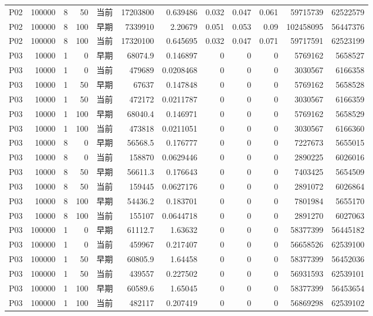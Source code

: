 \documentclass[UTF8,a4paper,10pt,twocolumn,fontset=fandol]{ctexart}
\begin{document}
\begin{longtable}{@{}lrrrlrrrrrrr@{}}
P02 & 100000 & 8 & 50 & 当前 & 17203800 & 0.639486 & 0.032 & 0.047 & 0.061 & 59715739 & 62522579 \\
P02 & 100000 & 8 & 100 & 早期 & 7339910 & 2.20679 & 0.051 & 0.053 & 0.09 & 102458095 & 56447376 \\
P02 & 100000 & 8 & 100 & 当前 & 17320100 & 0.645695 & 0.032 & 0.047 & 0.071 & 59717591 & 62523199 \\
P03 & 10000 & 1 & 0 & 早期 & 68074.9 & 0.146897 & 0 & 0 & 0 & 5769162 & 5658527 \\
P03 & 10000 & 1 & 0 & 当前 & 479689 & 0.0208468 & 0 & 0 & 0 & 3030567 & 6166358 \\
P03 & 10000 & 1 & 50 & 早期 & 67637 & 0.147848 & 0 & 0 & 0 & 5769162 & 5658528 \\
P03 & 10000 & 1 & 50 & 当前 & 472172 & 0.0211787 & 0 & 0 & 0 & 3030567 & 6166359 \\
P03 & 10000 & 1 & 100 & 早期 & 68040.4 & 0.146971 & 0 & 0 & 0 & 5769162 & 5658529 \\
P03 & 10000 & 1 & 100 & 当前 & 473818 & 0.0211051 & 0 & 0 & 0 & 3030567 & 6166360 \\
P03 & 10000 & 8 & 0 & 早期 & 56568.5 & 0.176777 & 0 & 0 & 0 & 7227673 & 5655015 \\
P03 & 10000 & 8 & 0 & 当前 & 158870 & 0.0629446 & 0 & 0 & 0 & 2890225 & 6026016 \\
P03 & 10000 & 8 & 50 & 早期 & 56611.3 & 0.176643 & 0 & 0 & 0 & 7403425 & 5654509 \\
P03 & 10000 & 8 & 50 & 当前 & 159445 & 0.0627176 & 0 & 0 & 0 & 2891072 & 6026864 \\
P03 & 10000 & 8 & 100 & 早期 & 54436.2 & 0.183701 & 0 & 0 & 0 & 7801984 & 5655170 \\
P03 & 10000 & 8 & 100 & 当前 & 155107 & 0.0644718 & 0 & 0 & 0 & 2891270 & 6027063 \\
P03 & 100000 & 1 & 0 & 早期 & 61112.7 & 1.63632 & 0 & 0 & 0 & 58377399 & 56445182 \\
P03 & 100000 & 1 & 0 & 当前 & 459967 & 0.217407 & 0 & 0 & 0 & 56658526 & 62539100 \\
P03 & 100000 & 1 & 50 & 早期 & 60805.9 & 1.64458 & 0 & 0 & 0 & 58377399 & 56452036 \\
P03 & 100000 & 1 & 50 & 当前 & 439557 & 0.227502 & 0 & 0 & 0 & 56931593 & 62539101 \\
P03 & 100000 & 1 & 100 & 早期 & 60589.6 & 1.65045 & 0 & 0 & 0 & 58377399 & 56453654 \\
P03 & 100000 & 1 & 100 & 当前 & 482117 & 0.207419 & 0 & 0 & 0 & 56869298 & 62539102 \\

\end{longtable}
\end{document}
